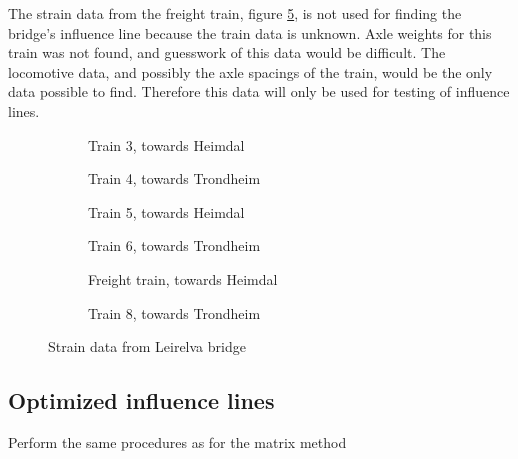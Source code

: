The strain data from the freight train, figure \ref{fig:strain_train7}, is not used for finding the bridge's influence line because the train data is unknown. Axle weights for this train was not found, and guesswork of this data would be difficult. The locomotive data, and possibly the axle spacings of the train, would be the only data possible to find. Therefore this data will only be used for testing of influence lines.
\begin{figure}[H]
	\centering
	\begin{subfigure}[t]{0.4\textwidth}
		\centering
		
		\caption{Train 3, towards Heimdal}
		\label{fig:strain_train3}
	\end{subfigure}
	\qquad
	\begin{subfigure}[t]{0.4\textwidth}
		\centering
		
		\caption{Train 4, towards Trondheim}
		\label{fig:strain_train4}
	\end{subfigure}

	\begin{subfigure}[t]{0.4\textwidth}
		\centering
		
		\caption{Train 5, towards Heimdal}
		\label{fig:strain_train5}
	\end{subfigure}
	\qquad
  \begin{subfigure}[t]{0.4\textwidth}
    \centering
    
		\caption{Train 6, towards Trondheim}
    \label{fig:strain_train6}
  \end{subfigure}

  \begin{subfigure}[t]{0.4\textwidth}
    \centering
    
		\caption{Freight train, towards Heimdal}
    \label{fig:strain_train7}
  \end{subfigure}
    \qquad
	\begin{subfigure}[t]{0.4\textwidth}
		\centering
		
		\caption{Train 8, towards Trondheim}
		\label{fig:strain_train8}
	\end{subfigure}
  \caption{Strain data from Leirelva bridge}
  \label{fig:strain_all}
\end{figure}

\subsection{Optimized influence lines}
Perform the same procedures as for the matrix method


